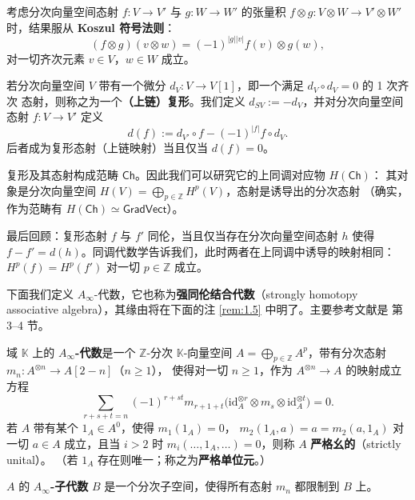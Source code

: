 考虑分次向量空间态射 $f:V\to V'$ 与 $g:W\to W'$ 的张量积
$f\otimes g:V\otimes W\to V'\otimes W'$ 时，结果服从 \textbf{Koszul 符号法则}：
\[
  (f\otimes g)(v\otimes w)=(-1)^{|g||v|}f(v)\otimes g(w),
\]
对一切齐次元素 $v\in V$，$w\in W$ 成立。

\begin{Def}\label{def:1.2}
若分次向量空间 $V$ 带有一个微分 $d_V:V\to V[1]$，即一个满足 $d_V\circ d_V=0$ 的 1 次齐次
态射，则称之为一个\textbf{（上链）复形}。我们定义 $d_{SV}:=-d_V$，并对分次向量空间态射
$f:V\to V'$ 定义
\[
  d(f):=d_{V'}\circ f-(-1)^{|f|}f\circ d_V .
\]
后者成为复形态射（上链映射）当且仅当 $d(f)=0$。

复形及其态射构成范畴 $\mathsf{Ch}$。因此我们可以研究它的上同调对应物 $H(\mathsf{Ch})$：
其对象是分次向量空间 $H(V)=\bigoplus_{p\in\mathbb Z}H^p(V)$，态射是诱导出的分次态射
（确实，作为范畴有 $H(\mathsf{Ch})\simeq\mathsf{GradVect}$）。
\end{Def}

最后回顾：复形态射 $f$ 与 $f'$ 同伦，当且仅当存在分次向量空间态射 $h$ 使得
$f-f'=d(h)$。同调代数学告诉我们，此时两者在上同调中诱导的映射相同：
$H^p(f)=H^p(f')$ 对一切 $p\in\mathbb Z$ 成立。

下面我们定义 $A_\infty$-代数，它也称为\textbf{强同伦结合代数}（strongly homotopy
associative algebra），其缘由将在下面的注 \ref{rem:1.5} 中明了。主要参考文献是
\cite{Kel01} 第 3–4 节。

\begin{Def}\label{def:1.3}
域 $\mathbb K$ 上的 \textbf{$A_\infty$-代数}是一个 $\mathbb Z$-分次 $\mathbb K$-向量空间
$A=\bigoplus_{p\in\mathbb Z}A^p$，带有分次态射 $m_n:A^{\otimes n}\to A[2-n]$（$n\ge 1$），
使得对一切 $n\ge 1$，作为 $A^{\otimes n}\to A$ 的映射成立方程
\begin{equation}\label{eq:1.1}
  \sum_{r+s+t=n}(-1)^{r+st}m_{r+1+t}
  \bigl(\mathrm{id}_A^{\otimes r}\otimes m_s\otimes\mathrm{id}_A^{\otimes t}\bigr)=0 .
\end{equation}
若 $A$ 带有某个 $1_A\in A^0$，使得 $m_1(1_A)=0$，
$m_2(1_A,a)=a=m_2(a,1_A)$ 对一切 $a\in A$ 成立，且当 $i>2$ 时
$m_i(\dots,1_A,\dots)=0$，则称 $A$ \textbf{严格幺的}（strictly unital）。
（若 $1_A$ 存在则唯一；称之为\textbf{严格单位元}。）

$A$ 的 \textbf{$A_\infty$-子代数} $B$ 是一个分次子空间，使得所有态射 $m_n$ 都限制到 $B$ 上。
\end{Def}



